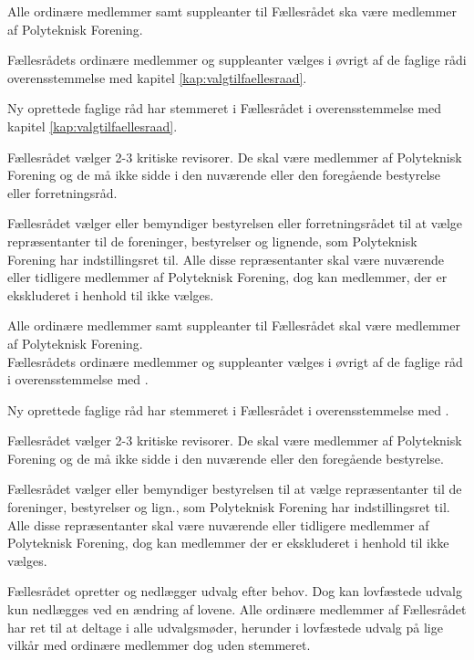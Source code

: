 \begin{list}
 Alle ordinære medlemmer samt suppleanter til Fællesrådet ska være medlemmer af Polyteknisk Forening.

 Fællesrådets ordinære medlemmer og suppleanter vælges i øvrigt af de faglige rådi overensstemmelse med kapitel \ref{kap:valgtilfaellesraad}.

 Ny oprettede faglige råd har stemmeret i Fællesrådet i overensstemmelse med kapitel \ref{kap:valgtilfaellesraad}.

\item Fællesrådet vælger 2-3 kritiske revisorer. De skal være medlemmer af Polyteknisk Forening og de må ikke sidde i den nuværende eller den foregående bestyrelse eller forretningsråd. 

\item Fællesrådet vælger eller bemyndiger bestyrelsen eller forretningsrådet til at vælge repræsentanter til de foreninger, bestyrelser og lignende, som Polyteknisk Forening har indstillingsret til. Alle disse repræsentanter skal være nuværende eller tidligere medlemmer af Polyteknisk Forening, dog kan medlemmer, der er ekskluderet i henhold til  ikke vælges.

 Alle ordinære medlemmer samt suppleanter til Fællesrådet skal være medlemmer af Polyteknisk Forening.\\

 Fællesrådets ordinære medlemmer og suppleanter vælges i øvrigt af de faglige råd i overensstemmelse med .

 Ny oprettede faglige råd har stemmeret i Fællesrådet i overensstemmelse med .

\item Fællesrådet vælger 2-3 kritiske revisorer. De skal være medlemmer af Polyteknisk Forening og de må ikke sidde i den nuværende eller den foregående bestyrelse. 

\item Fællesrådet vælger eller bemyndiger bestyrelsen til at vælge repræsentanter til de foreninger, bestyrelser og lign., som Polyteknisk Forening har indstillingsret til. Alle disse repræsentanter skal være nuværende eller tidligere medlemmer af Polyteknisk Forening, dog kan medlemmer der er ekskluderet i henhold til  ikke vælges.

\item Fællesrådet opretter og nedlægger udvalg efter behov. Dog kan lovfæstede udvalg kun nedlægges ved en ændring af lovene. Alle ordinære medlemmer af Fællesrådet har ret til at deltage i alle udvalgsmøder, herunder i lovfæstede udvalg på lige vilkår med ordinære medlemmer dog uden stemmeret.


\end{list}
